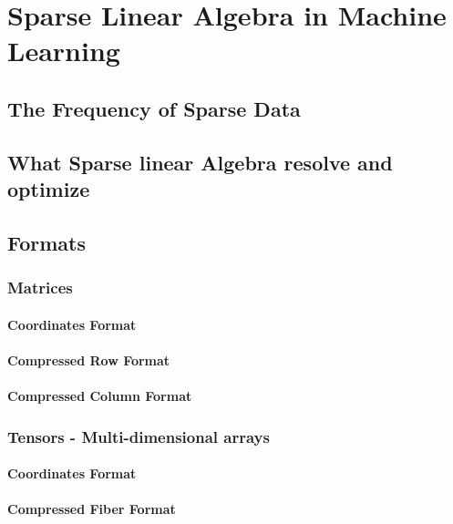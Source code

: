 \chapter{Sparse Linear Algebra in Machine Learning}

\section{The Frequency of Sparse Data}

\section{What Sparse linear Algebra resolve and optimize}

\section{Formats}
\subsection{Matrices}
\subsubsection{Coordinates Format}
\subsubsection{Compressed Row Format}
\subsubsection{Compressed Column Format}
\subsection{Tensors - Multi-dimensional arrays}
\subsubsection{Coordinates Format}
\subsubsection{Compressed Fiber Format}
